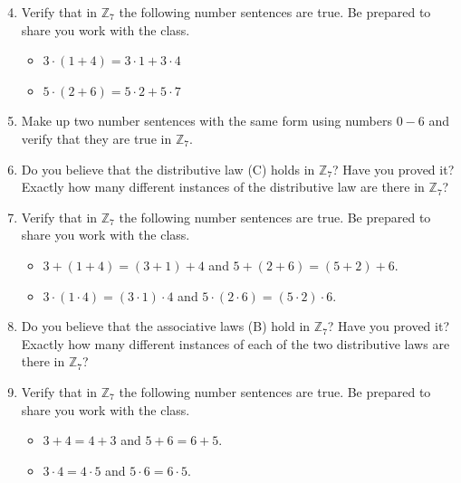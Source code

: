 \documentclass[11pt]{article}
\newenvironment{task}
	{\begin{mdframed}[linecolor=lightgray, linewidth=3pt]\raggedright}
	{\end{mdframed}}
\theoremstyle{definition}
\begin{document}
\begin{task}
    \begin{enumerate}
        \setcounter{enumi}{3}
      \item Verify that in $\mathbb{Z}_7$ the following number sentences are true. Be prepared to share you work with the class.
        \begin{itemize}
          \item $3\cdot (1+4) = 3\cdot 1 + 3 \cdot 4$
          \item $5\cdot (2 + 6) = 5\cdot 2 + 5 \cdot 7$
        \end{itemize}
      \item Make up two number sentences with the same form using numbers $0-6$ and verify that they are true in $\mathbb{Z}_7$.

        \vspace{1.5in}

      \item Do you believe that the distributive law (C) holds in $\mathbb{Z}_7$? Have you proved it? Exactly how many different 
        instances of the distributive law are there in $\mathbb{Z}_7$?

        \vspace{1.5in}

      \item Verify that in $\mathbb{Z}_7$ the following number sentences are true. Be prepared to share you work with the class.
        \begin{itemize}
          \item $3 + (1+4) = (3+1)+4$ and $5 + (2 + 6) = (5 + 2) + 6$.
          \item $3 \cdot (1\cdot 4) = (3\cdot 1)\cdot 4$ and $5 \cdot (2 \cdot 6) = (5 \cdot 2) \cdot 6$.
        \end{itemize}

        \vspace{1.5in}

      \item Do you believe that the associative laws (B) hold in $\mathbb{Z}_7$? Have you proved it? Exactly how many different 
        instances of each of the two distributive laws are there in $\mathbb{Z}_7$?

        \vspace{1.5in}

      \item Verify that in $\mathbb{Z}_7$ the following number sentences are true. Be prepared to share you work with the class.
        \begin{itemize}
          \item $3 +4 = 4+3$ and $5 + 6 = 6+ 5$.
          \item $3 \cdot 4 = 4\cdot 5$ and $5 \cdot 6 = 6 \cdot 5$.
        \end{itemize}


\end{enumerate}
\end{task}
\end{document}
